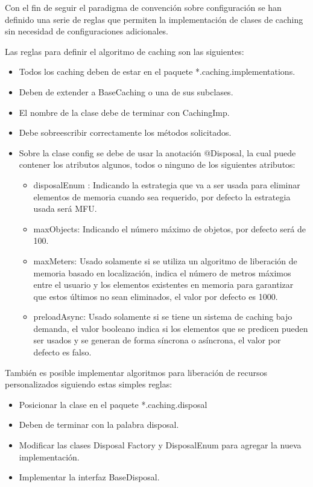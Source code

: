 \documentclass[12pt,a4paper,spanish,openany]{book}
\begin{document}
Con el fin de seguir el paradigma de convención sobre configuración se han
definido una serie de reglas que permiten la implementación de clases de caching
sin necesidad de configuraciones adicionales.

Las reglas para definir el algoritmo de caching son las siguientes:

\begin{itemize}
  \item Todos los caching deben de estar en el paquete
  *.caching.implementations.
  \item Deben de extender a BaseCaching o una de sus subclases.
  \item El nombre de la clase debe de terminar con CachingImp. 
  \item Debe sobreescribir correctamente los métodos solicitados.
  \item Sobre la clase config se debe de usar la anotación  @Disposal, la cual puede
contener los atributos algunos, todos o ninguno de los siguientes atributos:
    \begin{itemize}
        \item disposalEnum : Indicando la estrategia que va a ser usada para
        eliminar elementos de memoria cuando sea requerido, por defecto la estrategia
        usada será MFU.
        \item maxObjects: Indicando el número máximo de objetos, por defecto será de
        100.
        \item maxMeters: Usado solamente si se utiliza un algoritmo de
        liberación de memoria basado en localización, indica el número de metros máximos entre
        el usuario y los elementos existentes en memoria para garantizar que
        estos últimos no sean eliminados, el valor por defecto es 1000.
        \item preloadAsync: Usado solamente si se tiene un sistema de caching bajo
        demanda, el valor booleano indica si los elementos que se predicen
        pueden ser usados y se generan de forma síncrona o asíncrona, el valor
        por defecto es falso.         
    \end{itemize}
\end{itemize}
      
        
 También es posible implementar algoritmos para liberación de
 recursos personalizados siguiendo estas simples reglas:
 \begin{itemize}
   \item Posicionar la clase en el paquete *.caching.disposal
   \item Deben de terminar con la palabra disposal.
   \item Modificar las clases Disposal Factory y DisposalEnum para agregar la
   nueva implementación.
   \item Implementar la interfaz BaseDisposal.
 \end{itemize}
\end{document}
